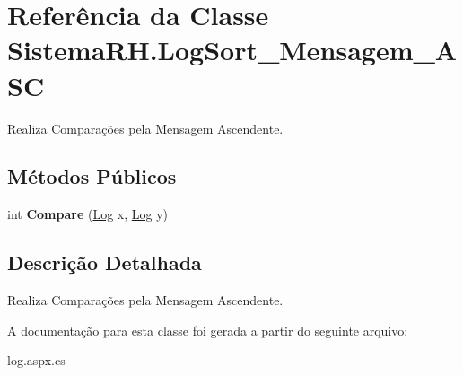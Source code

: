 \hypertarget{class_sistema_r_h_1_1_log_sort___mensagem___a_s_c}{
\section{Referência da Classe SistemaRH.LogSort\_\-Mensagem\_\-ASC}
\label{class_sistema_r_h_1_1_log_sort___mensagem___a_s_c}
}


Realiza Comparações pela Mensagem Ascendente.  


\subsection*{Métodos Públicos}
\begin{DoxyCompactItemize}
\item 
\hypertarget{class_sistema_r_h_1_1_log_sort___mensagem___a_s_c_a5122175066dd159e54f815ca25b1952b}{
int {\bfseries Compare} (\hyperlink{class_sistema_r_h_1_1_log}{Log} x, \hyperlink{class_sistema_r_h_1_1_log}{Log} y)}
\label{class_sistema_r_h_1_1_log_sort___mensagem___a_s_c_a5122175066dd159e54f815ca25b1952b}

\end{DoxyCompactItemize}


\subsection{Descrição Detalhada}
Realiza Comparações pela Mensagem Ascendente. 

A documentação para esta classe foi gerada a partir do seguinte arquivo:\begin{DoxyCompactItemize}
\item 
log.aspx.cs\end{DoxyCompactItemize}
